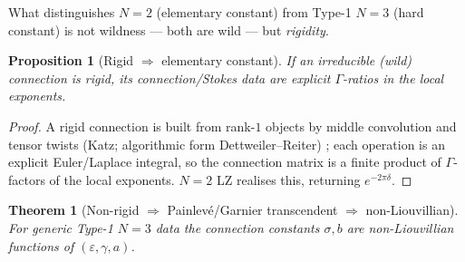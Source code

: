 \documentclass[11pt]{article}
\newtheorem{theorem}{Theorem}
\newtheorem{proposition}{Proposition}
\theoremstyle{definition}
\theoremstyle{remark}
\newcommand{\eps}{\varepsilon}
\begin{document}
What distinguishes $N{=}2$ (elementary constant) from Type-1 $N{=}3$ (hard constant) is not
wildness --- both are wild --- but \emph{rigidity}.

\begin{proposition}[Rigid $\Rightarrow$ elementary constant]\label{prop:rigid}
If an irreducible (wild) connection is rigid, its connection/Stokes data are explicit
$\Gamma$-ratios in the local exponents.
\end{proposition}

\begin{proof}
A rigid connection is built from rank-$1$ objects by middle convolution and tensor twists
(Katz; algorithmic form Dettweiler--Reiter) \cite{Katz1996,DR2000,DR2007}; each operation is
an explicit Euler/Laplace integral, so the connection matrix is a finite product of
$\Gamma$-factors of the local exponents. $N{=}2$ LZ realises this, returning $e^{-2\pi\delta}$.
\end{proof}

\begin{theorem}[Non-rigid $\Rightarrow$ Painlev\'e/Garnier transcendent $\Rightarrow$ non-Liouvillian]\label{thm:transc}
For generic Type-1 $N{=}3$ data the connection constants $\sigma,b$ are non-Liouvillian
functions of $(\eps,\gamma,a)$.
\end{theorem}
\end{document}
